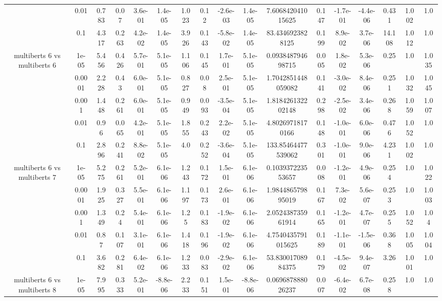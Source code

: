 \begin{tabular}{|c|c|c|c|c|c|c|c|c|c|c|c|c|c|c|c|c|}
 & 0.01 & 0.783 & 0.07 & 3.6e-01 & 1.4e-05 & 1.023 & 0.12 & -2.6e-03 & 1.4e-05 & 7.606842041015625 & 0.147 & -1.7e-01 & -4.4e-06 & 0.431 & 1.002 & 1.0 \\
 & 0.1 & 4.317 & 0.263 & 4.2e-02 & 1.4e-05 & 3.926 & 0.143 & -5.8e-02 & 1.4e-05 & 83.4346923828125 & 0.199 & 8.9e-02 & 3.7e-06 & 14.108 & 1.012 & 1.0 \\
\hline
\multirow{5}{*}{multiberts 6 vs multiberts 6} & 1e-05 & 5.456 & 0.426 & 5.7e-01 & 5.1e-05 & 1.106 & 0.145 & 1.7e-01 & 5.1e-05 & 0.093848794698715 & 0.005 & 1.8e-02 & 5.3e-06 & 0.25 & 1.0 & 1.035 \\
 & 0.0001 & 2.228 & 0.43 & 6.0e-01 & 5.1e-05 & 0.827 & 0.08 & 2.5e-01 & 5.1e-05 & 1.7042851448059082 & 0.141 & -3.0e-02 & 8.4e-06 & 0.251 & 1.032 & 1.045 \\
 & 0.001 & 1.448 & 0.261 & 6.0e-01 & 5.1e-05 & 0.949 & 0.093 & -3.5e-04 & 5.1e-05 & 1.818426132202148 & 0.298 & -2.5e-02 & 3.4e-06 & 0.268 & 1.059 & 1.007 \\
 & 0.01 & 0.96 & 0.065 & 4.2e-01 & 5.1e-05 & 1.855 & 0.243 & 2.2e-02 & 5.1e-05 & 4.80269718170166 & 0.148 & -1.0e-01 & 6.0e-06 & 0.476 & 1.052 & 1.0 \\
 & 0.1 & 2.896 & 0.241 & 8.8e-02 & 5.1e-05 & 4.0 & 0.252 & -3.6e-04 & 5.1e-05 & 133.85464477539062 & 0.301 & -1.0e-01 & 9.0e-06 & 4.231 & 1.002 & 1.0 \\
\hline
\multirow{5}{*}{multiberts 6 vs multiberts 7} & 1e-05 & 5.275 & 0.261 & 5.2e-01 & 6.1e-06 & 1.243 & 0.172 & 1.5e-01 & 6.1e-06 & 0.103937223553657 & 0.008 & -1.2e-01 & 4.9e-06 & 0.254 & 1.0 & 1.022 \\
 & 0.0001 & 1.925 & 0.327 & 5.5e-01 & 6.1e-06 & 1.197 & 0.173 & 2.6e-01 & 6.1e-06 & 1.984486579895019 & 0.167 & 7.3e-02 & 5.6e-07 & 0.253 & 1.0 & 1.003 \\
 & 0.001 & 1.349 & 0.24 & 5.4e-01 & 6.1e-06 & 1.25 & 0.183 & -1.9e-02 & 6.1e-06 & 2.052438735961914 & 0.165 & -1.2e-01 & 4.7e-07 & 0.255 & 1.052 & 1.04 \\
 & 0.01 & 0.87 & 0.107 & 3.1e-01 & 6.1e-06 & 1.418 & 0.196 & -1.9e-02 & 6.1e-06 & 4.7540435791015625 & 0.189 & -1.1e-01 & -1.5e-06 & 0.368 & 1.005 & 1.004 \\
 & 0.1 & 3.682 & 0.281 & 6.4e-02 & 6.1e-06 & 1.233 & 0.083 & -2.9e-02 & 6.1e-06 & 53.83001708984375 & 0.179 & -4.5e-02 & 9.4e-07 & 3.26 & 1.001 & 1.0 \\
\hline
\multirow{5}{*}{multiberts 6 vs multiberts 8} & 1e-05 & 7.995 & 0.333 & 5.2e-01 & -8.8e-06 & 2.233 & 0.151 & 1.5e-01 & -8.8e-06 & 0.069687888026237 & 0.007 & -6.4e-02 & 6.7e-08 & 0.258 & 1.0 & 1.0 \\

\end{tabular}
